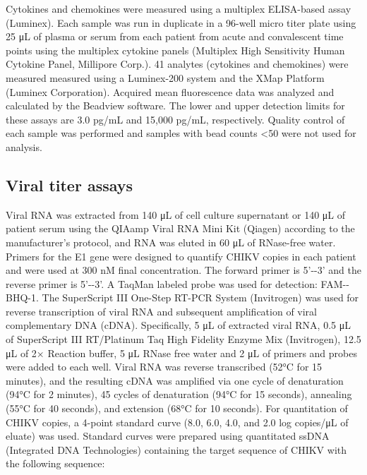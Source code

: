 Cytokines and chemokines were measured using a multiplex ELISA-based assay (Luminex). Each sample was run in duplicate in a 96-well micro titer plate using 25 μL of plasma or serum from each patient from acute and convalescent time points using the multiplex cytokine panels (Multiplex High Sensitivity Human Cytokine Panel, Millipore Corp.). 41 analytes (cytokines and chemokines) were measured measured using a Luminex-200 system and the XMap Platform (Luminex Corporation). Acquired mean fluorescence data was analyzed and calculated by the Beadview software. The lower and upper detection limits for these assays are 3.0 pg/mL and 15,000 pg/mL, respectively. Quality control of each sample was performed and samples with bead counts <50 were not used for analysis.  

\subsection{Viral titer assays}

Viral RNA was extracted from 140 μL of cell culture supernatant or 140 μL of patient serum using the QIAamp Viral RNA Mini Kit (Qiagen) according to the manufacturer’s protocol, and RNA was eluted in 60 μL of RNase-free water. Primers for the E1 gene were designed to quantify CHIKV copies in each patient and were used at 300 nM final concentration. The forward primer is 5'-\texttt{}-3' and the reverse primer is 5'-\texttt{}-3'.  A TaqMan labeled probe was used for detection: FAM-\texttt{}-BHQ-1. The SuperScript III One-Step RT-PCR System (Invitrogen) was used for reverse transcription of viral RNA and subsequent amplification of viral complementary DNA (cDNA). Specifically, 5 μL of extracted viral RNA, 0.5 μL of SuperScript III RT/Platinum Taq High Fidelity Enzyme Mix (Invitrogen), 12.5 μL of 2× Reaction buffer, 5 μL RNase free water and 2 μL of primers and probes were added to each well. Viral RNA was reverse transcribed (52°C for 15 minutes), and the resulting cDNA was amplified via one cycle of denaturation (94°C for 2 minutes), 45 cycles of denaturation (94°C for 15 seconds), annealing (55°C for 40 seconds), and extension (68°C for 10 seconds). For quantitation of CHIKV copies, a 4-point standard curve (8.0, 6.0, 4.0, and 2.0 log copies/μL of eluate) was used. Standard curves were prepared using quantitated ssDNA (Integrated DNA Technologies) containing the target sequence of CHIKV with the following sequence: \texttt{}

